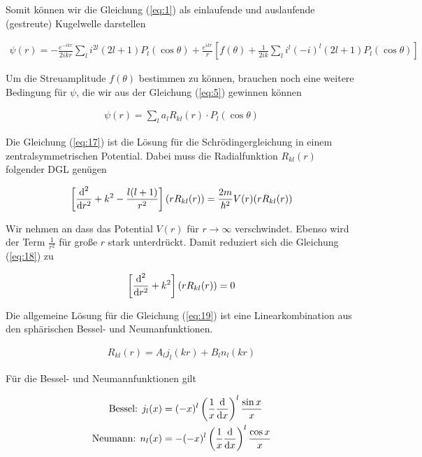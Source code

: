 Somit können wir die Gleichung (\ref{eq:1}) als einlaufende und auslaufende (gestreute) Kugelwelle darstellen

\begin{align}
  \label{eq:16}
  \boxed{ \psi(r) =  -  \frac{e^{-ikr}}{2ikr} \sum_{l}i^{2l}(2l+1) P_l(\cos\theta) +  \frac{e^{i k r}}{r}\left[f(\theta) +  \frac{1}{2ik} \sum_{l}i^l(-i)^l(2l+1) P_l(\cos\theta)\right] }
\end{align}

Um die Streuamplitude \(f(\theta)\) bestimmen zu können, brauchen noch eine weitere Bedingung für \(\psi\), die wir aus der Gleichung (\ref{eq:5}) gewinnen können

\begin{align}
  \label{eq:17}
   \psi(r) = \sum_l a_{l} R_{kl}(r)\cdot P_{l}(\cos\theta)
\end{align}

Die Gleichung (\ref{eq:17}) ist die Lösung für die Schrödingergleichung in einem zentralsymmetrischen Potential. Dabei muss die Radialfunktion \( R_{kl}(r)\) folgender DGL genügen

\begin{align}
  \label{eq:18}
  \left[ \diff^2_r + k^2 - \frac{l(l+1)}{r^2} \right](rR_{kl}(r)) = \frac{2m}{\hbar^2} V(r)(rR_{kl}(r))
\end{align}

Wir nehmen an dass das Potential \(V(r)\) für \(r\to\infty\) verschwindet. Ebenso wird der Term \(\frac{1}{r^2}\) für große \(r\) stark unterdrückt. Damit reduziert sich die Gleichung (\ref{eq:18}) zu

\begin{align}
  \label{eq:19}
   \left[ \diff^2_r + k^2 \right](rR_{kl}(r)) = 0
\end{align}

Die allgemeine Lösung für die Gleichung (\ref{eq:19}) ist eine Linearkombination aus den sphärischen Bessel- und Neumanfunktionen.

\begin{align}
  \label{eq:20}
  R_{kl}(r) = A_l j_l(kr) + B_l n_l(kr) 
\end{align}

Für die Bessel- und Neumannfunktionen gilt

\begin{align}
    \text{Bessel: } j_l(x) &= (-x)^l\left(\frac{1}{x} \diff_x \right)^l \frac{\sin x}{x} \label{eq:21}\\
  \text{Neumann: } n_l(x) &= - (-x)^l\left(\frac{1}{x} \diff_x \right)^l \frac{\cos x}{x} \label{eq:22}
\end{align}

